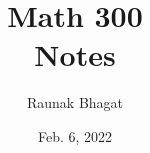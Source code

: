 \documentclass{article}
\begin{document}
\title{Math 300\\Notes}
\author{Raunak Bhagat}
\date{Feb. 6, 2022}
\maketitle

\newpage
{}
\end{document}
